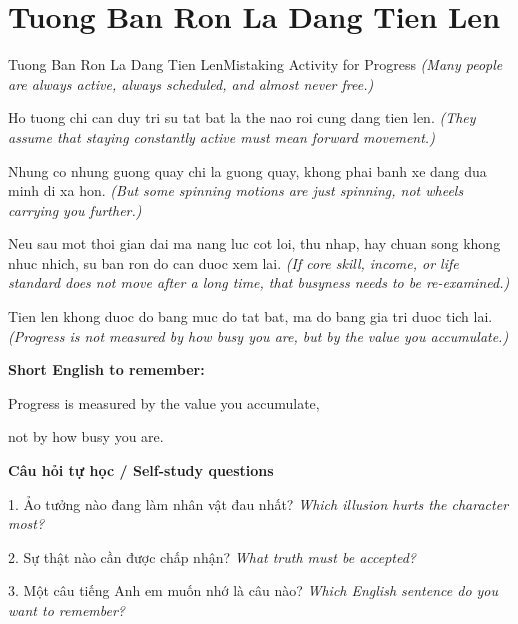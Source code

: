 \section{Tuong Ban Ron La Dang Tien Len}
\begin{truyen}{Tuong Ban Ron La Dang Tien Len}{Mistaking Activity for Progress}
\textit{(Many people are always active, always scheduled, and almost never free.)}

Ho tuong chi can duy tri su tat bat la the nao roi cung dang tien len.
\textit{(They assume that staying constantly active must mean forward movement.)}

Nhung co nhung guong quay chi la guong quay, khong phai banh xe dang dua minh di xa hon.
\textit{(But some spinning motions are just spinning, not wheels carrying you further.)}

Neu sau mot thoi gian dai ma nang luc cot loi, thu nhap, hay chuan song khong nhuc nhich, su ban ron do can duoc xem lai.
\textit{(If core skill, income, or life standard does not move after a long time, that busyness needs to be re-examined.)}

\end{truyen}

\begin{baihoc}
Tien len khong duoc do bang muc do tat bat, ma do bang gia tri duoc tich lai.
\textit{(Progress is not measured by how busy you are, but by the value you accumulate.)}
\end{baihoc}

\begin{ghinhoanh}
\textbf{Short English to remember:}

Progress is measured by the value you accumulate,

not by how busy you are.

\end{ghinhoanh}

\begin{tuhocnhanh}
\textbf{Câu hỏi tự học / Self-study questions}

1. Ảo tưởng nào đang làm nhân vật đau nhất? \textit{Which illusion hurts the character most?}

2. Sự thật nào cần được chấp nhận? \textit{What truth must be accepted?}

3. Một câu tiếng Anh em muốn nhớ là câu nào? \textit{Which English sentence do you want to remember?}
\end{tuhocnhanh}
\ngancach

